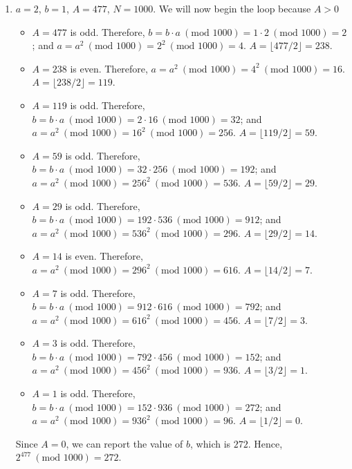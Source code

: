 {\begin{enumerate}
\begin{itemize}
            \item $A = 1$ is odd. Therefore, $b = b \cdot a \ (\text{mod } 256) = 113 \cdot 1 \ (\text{mod } 256) = 113$; and $a = a^2 \ (\text{mod } 256) = 1^2 \ (\text{mod 256}) = 1$. $A = \lfloor 1 / 2 \rfloor = 0$.
        \end{itemize}
        Since $A = 0$, we can report the value of $b$, which is $113$. Hence, $17^183 \ (\text{mod }256) = 113$.
        \item $a = 2$, $b = 1$, $A = 477$, $N = 1000$. We will now begin the loop because $A > 0$
        \begin{itemize}
            \item $A = 477$ is odd. Therefore, $b = b \cdot a \ (\text{mod } 1000) = 1 \cdot 2 \ (\text{mod } 1000) = 2$; and $a = a^2 \ (\text{mod } 1000) = 2^2 \ (\text{mod } 1000) = 4$. $A = \lfloor 477 / 2 \rfloor = 238$.
            \item $A = 238$ is even. Therefore, $a = a^2 \ (\text{mod } 1000) = 4^2 \ (\text{mod } 1000) = 16$. $A = \lfloor 238 / 2 \rfloor = 119$.
            \item $A = 119$ is odd. Therefore, $b = b \cdot a \ (\text{mod } 1000) = 2 \cdot 16 \ (\text{mod } 1000) = 32$; and $a = a^2 \ (\text{mod } 1000) = 16^2 \ (\text{mod } 1000) = 256$. $A = \lfloor 119 / 2 \rfloor = 59$.
            \item $A = 59$ is odd. Therefore, $b = b \cdot a \ (\text{mod } 1000) = 32 \cdot 256 \ (\text{mod } 1000) = 192$; and $a = a^2 \ (\text{mod } 1000) = 256^2 \ (\text{mod } 1000) = 536$. $A = \lfloor 59 / 2 \rfloor = 29$.
            \item $A = 29$ is odd. Therefore, $b = b \cdot a \ (\text{mod } 1000) = 192 \cdot 536 \ (\text{mod } 1000) = 912$; and $a = a^2 \ (\text{mod } 1000) = 536^2 \ (\text{mod } 1000) = 296$. $A = \lfloor 29 / 2 \rfloor = 14$.
            \item $A = 14$ is even. Therefore, $a = a^2 \ (\text{mod } 1000) = 296^2 \ (\text{mod } 1000) = 616$. $A = \lfloor 14 / 2 \rfloor = 7$.
            \item $A = 7$ is odd. Therefore, $b = b \cdot a \ (\text{mod } 1000) = 912 \cdot 616 \ (\text{mod } 1000) = 792$; and $a = a^2 \ (\text{mod } 1000) = 616^2 \ (\text{mod } 1000) = 456$. $A = \lfloor 7 / 2 \rfloor = 3$.
            \item $A = 3$ is odd. Therefore, $b = b \cdot a \ (\text{mod } 1000) = 792 \cdot 456 \ (\text{mod } 1000) = 152$; and $a = a^2 \ (\text{mod } 1000) = 456^2 \ (\text{mod } 1000) = 936$. $A = \lfloor 3 / 2 \rfloor = 1$.
            \item $A = 1$ is odd. Therefore, $b = b \cdot a \ (\text{mod } 1000) = 152 \cdot 936 \ (\text{mod } 1000) = 272$; and $a = a^2 \ (\text{mod } 1000) = 936^2 \ (\text{mod } 1000) = 96$. $A = \lfloor 1 / 2 \rfloor = 0$.
        \end{itemize}
        Since $A = 0$, we can report the value of $b$, which is $272$. Hence, $2^477 \ (\text{mod }1000) = 272$.
    \end{enumerate}
}

